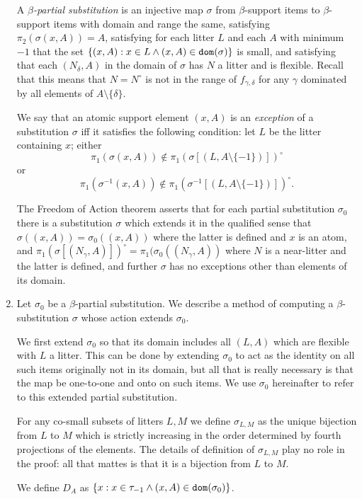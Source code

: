 \documentclass[12pt]{article}
\begin{document}
\begin{enumerate}
A {\em $\beta$-partial substitution\/} is an injective map $\sigma$ from $\beta$-support items to $\beta$-support items with domain and range the same, satisfying $\pi_2(\sigma(x,A)) = A$, satisfying for each litter $L$ and each $A$ with minimum $-1$ that the set $\{(x,A): x \in L \wedge (x,A) \in {\tt dom}(\sigma)\}$ is small, and satisfying that each $(N_\delta,A)$
in the domain of $\sigma$ has $N$ a litter and is flexible.  Recall that this means that $N=N^\circ$ is not in the range of $f_{\gamma,\delta}$ for any $\gamma$ dominated by all elements of $A \setminus \{\delta\}$.

 We say that an atomic support element $(x,A)$ is an {\em exception\/} of a substitution $\sigma$ iff it satisfies the following condition:
let $L$ be the litter containing $x$; either $$\pi_1(\sigma(x,A)) \not\in \pi_1(\sigma[(L,A \setminus \{-1\})])^\circ$$ or $$\pi_1(\sigma^{-1}(x,A)) \not\in \pi_1(\sigma^{-1}[(L,A \setminus \{-1\})])^\circ.$$

The Freedom of Action theorem asserts that for each partial substitution $\sigma_0$  there is a substitution $\sigma$ which extends it in the qualified sense that $\sigma((x,A)) =\sigma_0((x,A))$ where the latter is defined and $x$ is an atom, and $\pi_1(\sigma[(N_\gamma,A)])^\circ = \pi_1(\sigma_0((N_\gamma,A))$ where $N$ is a near-litter and the latter is defined, and further $\sigma$ has no exceptions other than elements of its domain.

\item  Let $\sigma_0$ be a $\beta$-partial substitution.  We describe a method of computing a $\beta$-substitution $\sigma$ whose action extends $\sigma_0$.

We first extend $\sigma_0$ so that its domain includes all $(L,A)$ which are flexible with $L$ a litter.  This can be done by extending $\sigma_0$ to act as the identity on all such items originally not in its domain, but all that is really necessary is that the map be one-to-one and onto on such items.  We use $\sigma_0$ hereinafter to refer to this extended partial substitution.

For any co-small subsets of litters $L,M$ we define $\sigma_{L,M}$ as the unique bijection from $L$ to $M$ which is strictly increasing in the order determined by fourth projections of the elements.  The details of definition of $\sigma_{L,M}$ play no role in the proof: all that mattes is that it is a bijection from $L$ to $M$.

We define $D_A$ as $\{x:x \in \tau_{-1} \wedge (x,A) \in {\tt dom}(\sigma_0)\}$.


\end{enumerate}
\end{document}
